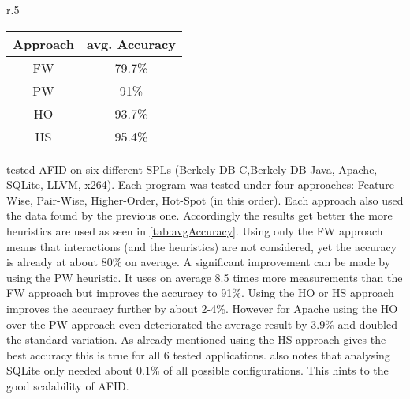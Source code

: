 \begin{wrapfigure}{r}{.5\textwidth}
	\centering
	\setlength{}
	\label{tab:avgAccuracy}
	\begin{tabular}{c|c}
		Approach&avg. Accuracy\\\midrule[1pt]
		FW&79.7\%\\\hline
		PW&91\%\\\hline
		HO&93.7\%\\\hline
		HS&95.4\%\\\hline
	\end{tabular}
\end{wrapfigure}\noindent
\citet{AutomatedFeatureDetectionSiegmund2012} tested AFID on six different SPLs (Berkely DB C,Berkely DB Java, Apache, SQLite, LLVM, x264). Each program was tested under four approaches: Feature-Wise, Pair-Wise, Higher-Order, Hot-Spot (in this order). Each approach also used the data found by the previous one. Accordingly the results get better the more heuristics are used as seen in \cref{tab:avgAccuracy}. Using only the FW approach means that interactions (and the heuristics) are not considered, yet the accuracy is already at about 80\% on average. A significant improvement can be made by using the PW heuristic. It uses on average 8.5 times more measurements than the FW approach but improves the accuracy to 91\%. Using the HO or HS approach improves the accuracy further by about 2-4\%. However for Apache using the HO over the PW approach even deteriorated the average result by 3.9\% and doubled the standard variation. As already mentioned using the HS approach gives the best accuracy this is true for all 6 tested applications. \citet{AutomatedFeatureDetectionSiegmund2012} also notes that analysing SQLite only needed about 0.1\% of all possible configurations. This hints to the good scalability of AFID.
